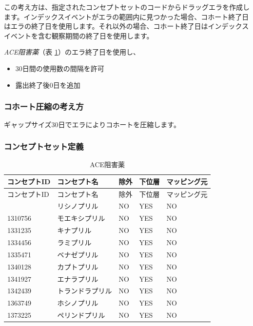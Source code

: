 \documentclass[
  11pt]{book}
\providecommand{\tightlist}{%
  \setlength{\itemsep}{0pt}\setlength{\parskip}{0pt}}
\theoremstyle{definition}
\theoremstyle{definition}
\theoremstyle{definition}
\theoremstyle{definition}
\theoremstyle{remark}
\begin{document}
この考え方は、指定されたコンセプトセットのコードからドラッグエラを作成します。インデックスイベントがエラの範囲内に見つかった場合、コホート終了日はエラの終了日を使用します。それ以外の場合、コホート終了日はインデックスイベントを含む観察期間の終了日を使用します。

\emph{ACE阻害薬}（表 \ref{tab:ACEiUseACE}）のエラ終了日を使用し、

\begin{itemize}
\tightlist
\item
  30日間の使用数の間隔を許可
\item
  露出終了後0日を追加
\end{itemize}

\subsubsection*{コホート圧縮の考え方}\label{ux30b3ux30dbux30fcux30c8ux5727ux7e2eux306eux8003ux3048ux65b9-2}

ギャップサイズ30日でエラによりコホートを圧縮します。

\subsubsection*{コンセプトセット定義}\label{ux30b3ux30f3ux30bbux30d7ux30c8ux30bbux30c3ux30c8ux5b9aux7fa9-4}

\begin{longtable}[]{@{}lllll@{}}
\caption{\label{tab:ACEiUseACE} ACE阻害薬}\tabularnewline
\toprule\noalign{}
コンセプトID & コンセプト名 & 除外 & 下位層 & マッピング元 \\
\midrule\noalign{}
\endfirsthead
\toprule\noalign{}
コンセプトID & コンセプト名 & 除外 & 下位層 & マッピング元 \\
\midrule\noalign{}
\endhead
\bottomrule\noalign{}
\endlastfoot
1308216 & リシノプリル & NO & YES & NO \\
1310756 & モエキシプリル & NO & YES & NO \\
1331235 & キナプリル & NO & YES & NO \\
1334456 & ラミプリル & NO & YES & NO \\
1335471 & ベナゼプリル & NO & YES & NO \\
1340128 & カプトプリル & NO & YES & NO \\
1341927 & エナラプリル & NO & YES & NO \\
1342439 & トランドラプリル & NO & YES & NO \\
1363749 & ホシノプリル & NO & YES & NO \\
1373225 & ペリンドプリル & NO & YES & NO \\
\end{longtable}
\end{document}
